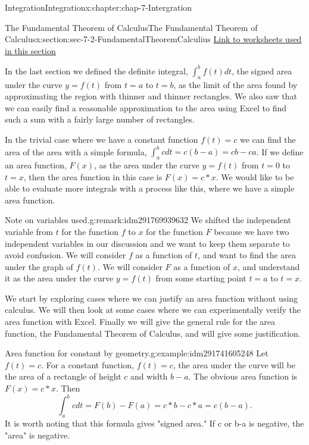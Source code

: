 \documentclass[oneside,10pt,]{book}
\numberwithin{equation}{section}
\begin{document}
\begin{chapterptx}{Integration}{}{Integration}{}{}{x:chapter:chap-7-Intergration}
\begin{sectionptx}{The Fundamental Theorem of Calculus}{}{The Fundamental Theorem of Calculus}{}{}{x:section:sec-7-2-FundamentalTheoremCalculius}
\href{./Examples/Section-7-2-Examples.xlsx}{Link to worksheets used in this section}%
\par
In the last section we defined the definite integral, \(\int_a^b f(t)dt\), the signed area under the curve \(y= f(t)\) from \(t=a\) to \(t=b\), as the limit of the area found by approximating the region with thinner and thinner rectangles.  We also saw that we can easily find a reasonable approximation to the area using Excel to find such a sum with a fairly large number of rectangles.%
\par
In the trivial case where we have a constant function \(f(t)=c\) we can find the area of the area with a simple formula, \(\int_a^bc dt=c(b-a)=cb-ca\). If we define an area function, \(F(x)\), as the area under the curve \(y=f(t)\) from \(t=0\) to \(t=x\), then the area function in this case is  \(F(x)=c*x\).  We would like to be able to evaluate more integrals with a process like this, where we have a simple area function.%
\begin{remark}{Note on variables used.}{g:remark:idm291769939632}%
We shifted the independent variable from \(t\) for the function \(f\) to \(x\) for the function \(F\) because we have two independent variables in our discussion and we want to keep them separate to avoid confusion.  We will consider \(f\) as a function of \(t\), and want to find the area under the graph of \(f(t)\).  We will consider \(F\) as a function of \(x\), and understand it as the area under the curve \(y=f(t)\) from some starting point \(t=a\) to \(t=x\).%
\end{remark}
We start by exploring cases where we can justify an area function without using calculus.  We will then look at some cases where we can experimentally verify the area function with Excel.  Finally we will give the general rule for the area function, the Fundamental Theorem of Calculus, and will give some justification.%
\begin{example}{Area function for constant by geometry.}{g:example:idm291741605248}%
Let \(f(t)=c\).  For a constant function, \(f(t)=c\), the area under the curve will be the area of a rectangle of height \(c\) and width \(b-a\).  The obvious area function is \(F(x)=c*x\).  Then%
%
\begin{equation*}
\int_a^b c dt=F(b)-F(a)=c*b-c*a=c(b-a).
\end{equation*}
It is worth noting that this formula gives "signed area."  If c or b-a is negative, the "area" is negative.%
\begin{sidebyside}{1}{0.2}{0.2}{0}%

\end{sidebyside}
\end{example}
\end{sectionptx}
\end{chapterptx}
\end{document}
